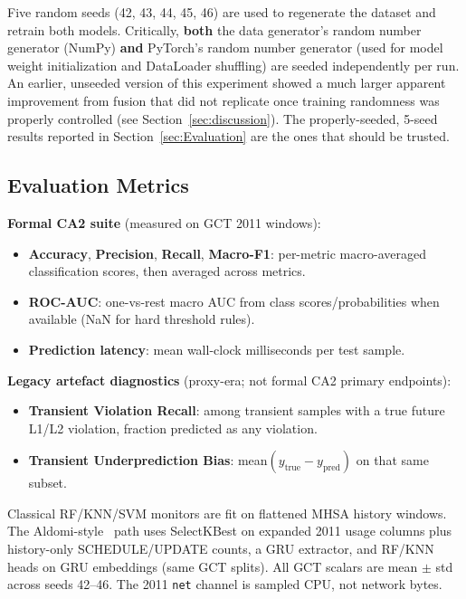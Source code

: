 Five random seeds (42, 43, 44, 45, 46) are used to regenerate the dataset and retrain both models. Critically, \textbf{both} the data generator's random number generator (NumPy) \textbf{and} PyTorch's random number generator (used for model weight initialization and DataLoader shuffling) are seeded independently per run. An earlier, unseeded version of this experiment showed a much larger apparent improvement from fusion that did not replicate once training randomness was properly controlled (see Section~\ref{sec:discussion}). The properly-seeded, 5-seed results reported in Section~\ref{sec:Evaluation} are the ones that should be trusted.

\subsection{Evaluation Metrics}
\label{subsec:metrics}

\textbf{Formal CA2 suite} (measured on GCT 2011 windows):
\begin{itemize}
  \item \textbf{Accuracy}, \textbf{Precision}, \textbf{Recall}, \textbf{Macro-F1}: per-metric macro-averaged classification scores, then averaged across metrics.
  \item \textbf{ROC-AUC}: one-vs-rest macro AUC from class scores/probabilities when available (NaN for hard threshold rules).
  \item \textbf{Prediction latency}: mean wall-clock milliseconds per test sample.
\end{itemize}

\textbf{Legacy artefact diagnostics} (proxy-era; not formal CA2 primary endpoints):
\begin{itemize}
  \item \textbf{Transient Violation Recall}: among transient samples with a true future L1/L2 violation, fraction predicted as any violation.
  \item \textbf{Transient Underprediction Bias}: mean$(y_{\text{true}} - y_{\text{pred}})$ on that same subset.
\end{itemize}

Classical RF/KNN/SVM monitors are fit on flattened MHSA history windows. The Aldomi-style~\cite{Aldomi26} path uses SelectKBest on expanded 2011 usage columns plus history-only SCHEDULE/UPDATE counts, a GRU extractor, and RF/KNN heads on GRU embeddings (same GCT splits). All GCT scalars are mean $\pm$ std across seeds 42--46. The 2011 \texttt{net} channel is sampled CPU, not network bytes.

